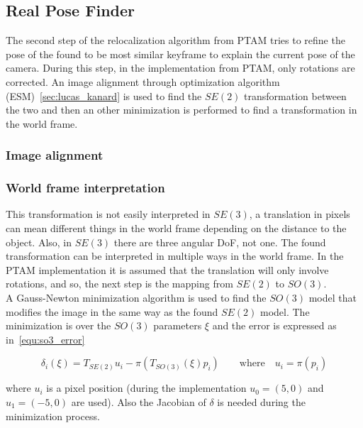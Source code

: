 \subsection{Real Pose Finder}
\label{sub:real_pose_finder}

The second step of the relocalization algorithm from PTAM tries to refine the pose of the found to be most similar keyframe to explain the current pose of the camera. During this step, in the implementation from PTAM, only rotations are corrected. An image alignment through optimization algorithm (ESM)~\ref{sec:lucas_kanard} is used to find the $SE(2)$ transformation between the two and then an other minimization is performed to find a transformation in the world frame.\\

\subsubsection{Image alignment}
\label{ssub:image_alignment}




\subsubsection{World frame interpretation}
\label{ssub:world_frame_interpretation}

This transformation is not easily interpreted in $SE(3)$, a translation in pixels can mean different things in the world frame depending on the distance to the object. Also, in $SE(3)$ there are three angular DoF, not one. The found transformation can be interpreted in multiple ways in the world frame. In the PTAM implementation it is assumed that the translation will only involve rotations, and so, the next step is the mapping from $SE(2)$ to $SO(3)$.\\

A Gauss-Newton minimization algorithm is used to find the $SO(3)$ model that modifies the image in the same way as the found $SE(2)$ model. The minimization is over the $SO(3)$ parameters $\xi$ and the error is expressed as in~\ref{equ:so3_error}

\begin{equation}
  \delta_i(\xi) = T_{SE(2)}u_i - \pi(T_{SO(3)}(\xi) p_i) \qquad \text{where} \quad u_i = \pi(p_i)
  \label{equ:so3_error}
\end{equation}


where $u_i$ is a pixel position (during the implementation $u_0=(5,0)$ and $u_1=(-5,0)$ are used). Also the Jacobian of $\delta$ is needed during the minimization process.

